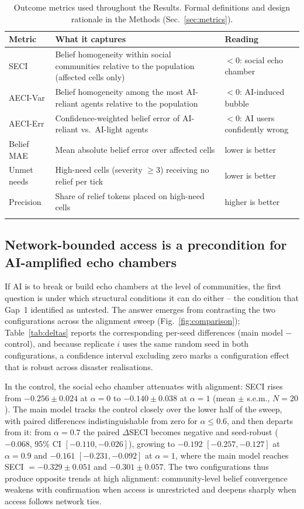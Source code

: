 \documentclass[pdflatex,sn-nature]{sn-jnl}
\begin{document}
\begin{table}[h]
\caption{Outcome metrics used throughout the Results. Formal definitions and design rationale in the Methods (Sec.~\ref{sec:metrics}).}\label{tab:metrics}
\footnotesize
\begin{tabular}{@{}lp{6.6cm}l@{}}
\toprule
Metric & What it captures & Reading \\
\midrule
SECI & Belief homogeneity within social communities relative to the population (affected cells only) & $<0$: social echo chamber \\
AECI-Var & Belief homogeneity among the most AI-reliant agents relative to the population & $<0$: AI-induced bubble \\
AECI-Err & Confidence-weighted belief error of AI-reliant vs.\ AI-light agents & $<0$: AI users confidently wrong \\
Belief MAE & Mean absolute belief error over affected cells & lower is better \\
Unmet needs & High-need cells (severity $\geq 3$) receiving no relief per tick & lower is better \\
Precision & Share of relief tokens placed on high-need cells & higher is better \\
\botrule
\end{tabular}
\end{table}

\subsection{Network-bounded access is a precondition for AI-amplified echo chambers}\label{sec:claim1}

If AI is to break or build echo chambers at the level of communities, the first question is under which structural conditions it can do either -- the condition that Gap~1 identified as untested. The answer emerges from contrasting the two configurations across the alignment sweep (Fig.~\ref{fig:comparison}); Table~\ref{tab:deltas} reports the corresponding per-seed differences (main model $-$ control), and because replicate $i$ uses the same random seed in both configurations, a confidence interval excluding zero marks a configuration effect that is robust across disaster realisations.

In the control, the social echo chamber attenuates with alignment: SECI rises from $-0.256 \pm 0.024$ at $\alpha = 0$ to $-0.140 \pm 0.038$ at $\alpha = 1$ (mean $\pm$ s.e.m., $N = 20$). The main model tracks the control closely over the lower half of the sweep, with paired differences indistinguishable from zero for $\alpha \leq 0.6$, and then departs from it: from $\alpha = 0.7$ the paired $\Delta$SECI becomes negative and seed-robust ($-0.068$, 95\% CI $[-0.110, -0.026]$), growing to $-0.192$ $[-0.257, -0.127]$ at $\alpha = 0.9$ and $-0.161$ $[-0.231, -0.092]$ at $\alpha = 1$, where the main model reaches SECI $= -0.329 \pm 0.051$ and $-0.301 \pm 0.057$. The two configurations thus produce opposite trends at high alignment: community-level belief convergence weakens with confirmation when access is unrestricted and deepens sharply when access follows network ties.
\end{document}
